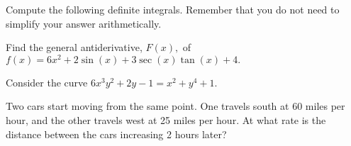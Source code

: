 \documentclass[addpoints,12pt]{exam}
\begin{document}
\begin{questions}

 \question Compute the following definite integrals. Remember that you do not need to simplify
your answer arithmetically.


\newpage

\question[5] Find the general antiderivative, $F(x),$ of $f(x) = 6x^2 + 2\sin(x) + 3\sec(x)\tan(x) +
4. $

\newpage

\question Consider the curve $6x^3y^2 + 2y -1 = x^2 + y^4 +1 .$


\newpage


\vfill

\newpage

\question[12] Two cars start moving from the same point. One travels south at 60 miles per
hour, and the other travels west at 25 miles per hour. At what rate is the distance between the
cars increasing 2 hours later?


\end{questions}
\end{document}
